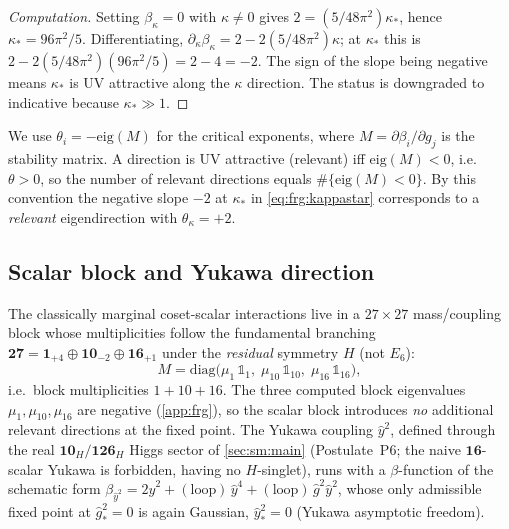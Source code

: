 \begin{proof}[Computation]
Setting $\beta_{\kappa}=0$ with $\kappa\neq0$ gives
$2=(5/48\pi^{2})\kappa_{\ast}$, hence $\kappa_{\ast}=96\pi^{2}/5$.
Differentiating, $\partial_{\kappa}\beta_{\kappa}=2-2(5/48\pi^{2})\kappa$;
at $\kappa_{\ast}$ this is $2-2(5/48\pi^{2})(96\pi^{2}/5)=2-4=-2$. The
sign of the slope being negative means $\kappa_{\ast}$ is UV attractive
along the $\kappa$ direction. The status is downgraded to indicative
because $\kappa_{\ast}\gg1$. \qedhere
\end{proof}

\begin{remark}
\label{rem:frg:convention}
We use $\theta_{i}=-\mathrm{eig}(M)$ for the critical exponents, where
$M=\partial\beta_{i}/\partial g_{j}$ is the stability matrix. A direction
is UV attractive (relevant) iff $\mathrm{eig}(M)<0$, i.e.\ $\theta>0$, so
the number of relevant directions equals $\#\{\mathrm{eig}(M)<0\}$. By this
convention the negative slope $-2$ at $\kappa_{\ast}$ in
\eqref{eq:frg:kappastar} corresponds to a \emph{relevant} eigendirection
with $\theta_{\kappa}=+2$.
\end{remark}

\subsection{Scalar block and Yukawa direction}
\label{sec:frg:scalar}

The classically marginal coset-scalar interactions live in a $27\times27$
mass/coupling block whose multiplicities follow the fundamental branching
$\mathbf{27}=\mathbf{1}_{+4}\oplus\mathbf{10}_{-2}\oplus\mathbf{16}_{+1}$
under the \emph{residual} symmetry $H$ (not $E_{6}$):
\begin{equation}\label{eq:frg:27block}
  M=\mathrm{diag}\bigl(\mu_{1}\,\mathbb{1}_{1},\;
                       \mu_{10}\,\mathbb{1}_{10},\;
                       \mu_{16}\,\mathbb{1}_{16}\bigr),
\end{equation}
i.e.\ block multiplicities $1+10+16$. The three computed block eigenvalues
$\mu_{1},\mu_{10},\mu_{16}$ are negative (\autoref{app:frg}), so the scalar
block introduces \emph{no} additional relevant directions at the fixed
point. The Yukawa coupling $\hat y^{2}$, defined through the real
$\mathbf{10}_{H}/\mathbf{126}_{H}$ Higgs sector of \autoref{sec:sm:main} (Postulate~P6;
the naive $\mathbf{16}$-scalar Yukawa is forbidden, having no $H$-singlet),
runs with a $\beta$-function of the schematic form
$\beta_{\hat y^{2}}=2\hat y^{2}+(\text{loop})\,\hat y^{4}+(\text{loop})\,\hat g^{2}\hat y^{2}$,
whose only admissible fixed point at $\hat g^{2}_{\ast}=0$ is again Gaussian,
$\hat y^{2}_{\ast}=0$ (Yukawa asymptotic freedom).

